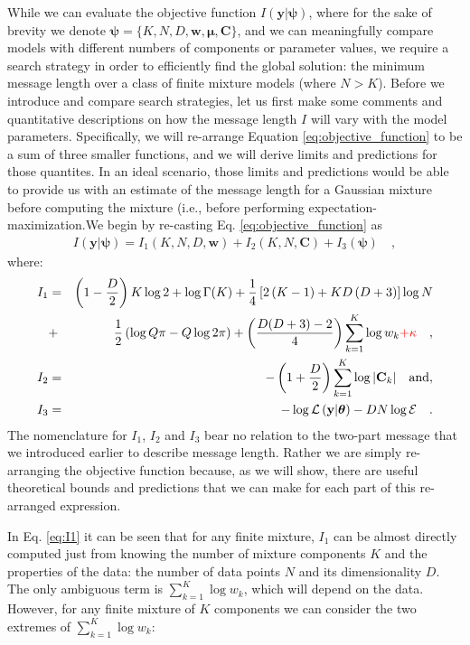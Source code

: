 \documentclass{elsarticle}
\newcommand{\todo}[1]{\textcolor{red}{#1}}
\newcommand{\vect}[1]{\boldsymbol{\mathbf{#1}}}
\renewcommand{\vec}[1]{\vect{#1}}
\def\cov{C}
\def\veccov{\vect{\cov}}
\def\vecmean{\vect{\mu}}
\def\weight{w}
\def\datum{y}
\def\data{\vect{\datum}}
\def\likelihood{\mathcal{L}}
\begin{document}
While we can evaluate the objective function $I(\vec{\data}|\vec{\psi})$, 
where for the sake of brevity we denote $\vec{\psi} = \{K, N, D, \vec{\weight}, 
\vecmean, \veccov\}$, and we can meaningfully compare models with different 
numbers of components or parameter values, we require a search strategy in 
order to efficiently find the global solution: the minimum message length 
over a class of finite mixture models (where $N > K$). Before we introduce and 
compare search strategies, let us first make some comments and quantitative 
descriptions on how the message length $I$ will vary with the model parameters. 
Specifically, we will re-arrange Equation \ref{eq:objective_function} to be a 
sum of three smaller functions, and we will derive limits and predictions for 
those quantites. In an ideal scenario, those limits and predictions would be 
able to provide us with an estimate of the message length for a Gaussian 
mixture before computing the mixture (i.e., before performing 
expectation-maximization.We begin by re-casting Eq. \ref{eq:objective_function} 
as
\begin{eqnarray}
I(\vec{\data}|\vec{\psi}) = I_{1}(K, N, D, \vec{\weight}) 
                          + I_{2}(K, N, \veccov)
                          + I_{3}(\vec{\psi}) \quad ,
\end{eqnarray}
\noindent{}where:
\begin{eqnarray}
    I_{1} &=& \left(1-\frac{D}{2}\right)K\log{2} + \log{\Gamma(K)} + \frac{1}{4}\left[2\left(K - 1\right) + KD\left(D+3\right)\right]\log{N} \nonumber \\
          &+& \frac{1}{2}\left(\log{Q\pi} - Q\log{2\pi}\right) + \left(\frac{D(D+3) - 2}{4}\right)\sum_{k=1}^{K}\log{\weight_k} \todo{+ \kappa} \quad , \label{eq:I1} \\
    I_{2} &=& -\left(1 + \frac{D}{2}\right)\sum_{k=1}^{K}\log{|\veccov_k|} \quad \textrm{and},\\
    I_{3} &=& -\log\likelihood\left(\vec{\data}|\vec{\theta}\right) - DN\log{\mathcal{E}} \quad .
\end{eqnarray}
The nomenclature for $I_1$, $I_2$ and $I_3$ bear no relation to the two-part 
message that we introduced earlier to describe message length. Rather we are
simply re-arranging the objective function because, as we will show, there are
useful theoretical bounds and predictions that we can make for each part of
this re-arranged expression.

In Eq. \ref{eq:I1} it can be seen that for any finite mixture, $I_1$ can be
almost directly computed just from knowing the number of mixture components
$K$ and the properties of the data: the number of data points $N$ and its
dimensionality $D$. The only ambiguous term is $\sum_{k=1}^{K}\log\weight_k$,
which will depend on the data. However, for any finite mixture of $K$
components we can consider the two extremes of $\sum_{k=1}^{K}\log\weight_k$:
\end{document}
